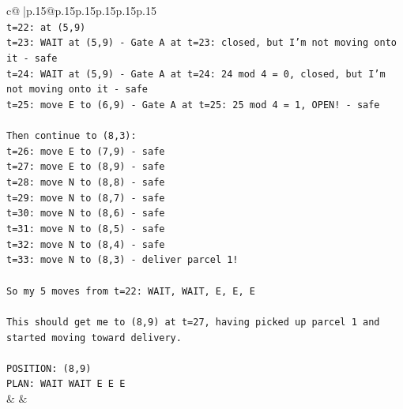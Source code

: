 \documentclass{article}
\begin{document}
{\begin{supertabular}{c@{$\;$}|p{.15\linewidth}@{}p{.15\linewidth}p{.15\linewidth}p{.15\linewidth}p{.15\linewidth}p{.15\linewidth}}
{{{\\ 
\texttt{t=22: at (5,9)} \\
\texttt{t=23: WAIT at (5,9) {-} Gate A at t=23: closed, but I'm not moving onto it {-} safe} \\
\texttt{t=24: WAIT at (5,9) {-} Gate A at t=24: 24 mod 4 = 0, closed, but I'm not moving onto it {-} safe} \\
\texttt{t=25: move E to (6,9) {-} Gate A at t=25: 25 mod 4 = 1, OPEN! {-} safe} \\
\\ 
\texttt{Then continue to (8,3):} \\
\texttt{t=26: move E to (7,9) {-} safe} \\
\texttt{t=27: move E to (8,9) {-} safe} \\
\texttt{t=28: move N to (8,8) {-} safe} \\
\texttt{t=29: move N to (8,7) {-} safe} \\
\texttt{t=30: move N to (8,6) {-} safe} \\
\texttt{t=31: move N to (8,5) {-} safe} \\
\texttt{t=32: move N to (8,4) {-} safe} \\
\texttt{t=33: move N to (8,3) {-} deliver parcel 1!} \\
\\ 
\texttt{So my 5 moves from t=22: WAIT, WAIT, E, E, E} \\
\\ 
\texttt{This should get me to (8,9) at t=27, having picked up parcel 1 and started moving toward delivery.} \\
\\ 
\texttt{POSITION: (8,9)} \\
\texttt{PLAN: WAIT WAIT E E E} \\
            }
        }
    }
    & & \\ \\


\end{supertabular}}
\end{document}
